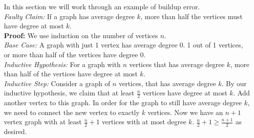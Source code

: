 In this section we will work through an example of buildup error. \\ 
\textit{Faulty Claim:} If a graph has average degree $k$, more than half the vertices must have degree at most $k$.\\
\textbf{Proof:} We use induction on the number of vertices $n$. \\
\textit{Base Case:} A graph with just 1 vertex has average degree $0$. 1 out of 1 vertices, or more than half of the vertices have degree 0. \\
\textit{Inductive Hypothesis:} For a graph with $n$ vertices that has average degree $k$, more than half of the vertices have degree at most $k$.\\
\textit{Inductive Step:} Consider a graph of $n$ vertices, that has average degree $k$. By our inductive hypothesis, we claim that at least $\frac{n}{2}$ vertices have degree at most $k$. Add another vertex to this graph. In order for the graph to still have average degree $k$, we need to connect the new vertex to exactly $k$ vertices. Now we have an $n+1$ vertex graph with at least $\frac{n}{2} + 1$ vertices with at most degree $k$. $\frac{n}{2} + 1 \geq \frac{n+1}{2}$ as desired.

